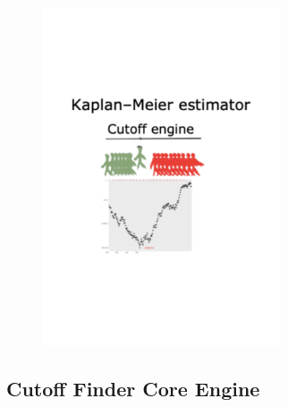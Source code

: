 \documentclass[
paper=landscape,
paper=160mm:90mm, %
fontsize=11pt, %
pagesize, %
parskip=half-, %
]{scrartcl} %
\theoremstyle{mythmstyle} %
\begin{document}
\begin{figure}
    \centering
\includegraphics[height=10cm]{KM_cutoff.pdf}
\end{figure}


\clearpage


\subsection{Cutoff Finder Core Engine}
\thispagestyle{headings}
\end{document}
